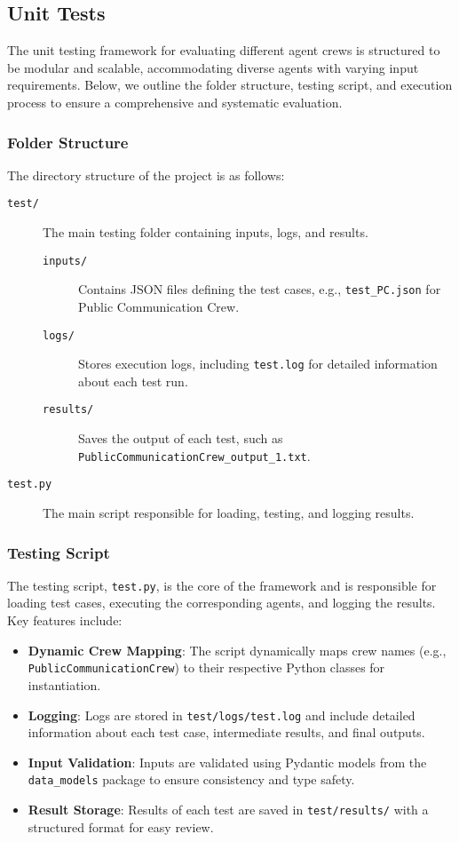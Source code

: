 \subsection{Unit Tests}
\label{subsec:unit_tests}

The unit testing framework for evaluating different agent crews is structured to be modular and scalable, accommodating diverse agents with varying input requirements. Below, we outline the folder structure, testing script, and execution process to ensure a comprehensive and systematic evaluation.

\subsubsection*{Folder Structure}
The directory structure of the project is as follows:

\begin{description}
    \item[\texttt{test/}] The main testing folder containing inputs, logs, and results.
    \begin{description}
        \item[\texttt{inputs/}] Contains JSON files defining the test cases, e.g., \texttt{test\_PC.json} for Public Communication Crew.
        \item[\texttt{logs/}] Stores execution logs, including \texttt{test.log} for detailed information about each test run.
        \item[\texttt{results/}] Saves the output of each test, such as \texttt{PublicCommunicationCrew\_output\_1.txt}.
    \end{description}
    \item[\texttt{test.py}] The main script responsible for loading, testing, and logging results.
\end{description}

\subsubsection*{Testing Script}
The testing script, \texttt{test.py}, is the core of the framework and is responsible for loading test cases, executing the corresponding agents, and logging the results. Key features include:

\begin{itemize}
    \item \textbf{Dynamic Crew Mapping}: The script dynamically maps crew names (e.g., \texttt{PublicCommunicationCrew}) to their respective Python classes for instantiation.
    \item \textbf{Logging}: Logs are stored in \texttt{test/logs/test.log} and include detailed information about each test case, intermediate results, and final outputs.
    \item \textbf{Input Validation}: Inputs are validated using Pydantic models from the \texttt{data\_models} package to ensure consistency and type safety.
    \item \textbf{Result Storage}: Results of each test are saved in \texttt{test/results/} with a structured format for easy review.
\end{itemize}

